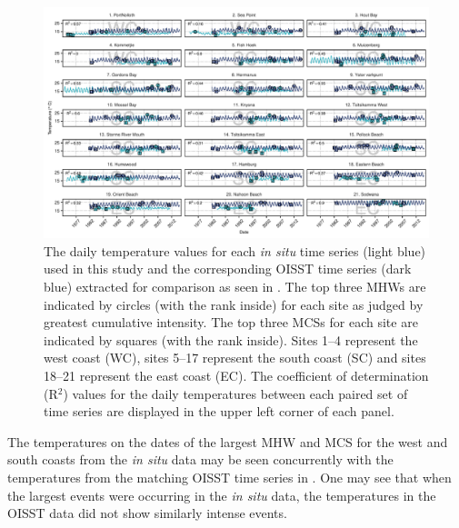 \documentclass[a4paper,10pt,review]{elsarticle}
\begin{document}
\begin{figure}
\centering
\includegraphics[width=1.0\textwidth]{figure2.pdf}
\caption{The daily temperature values for each \emph{in situ} time series (light blue) used in this study and the corresponding OISST time series (dark blue) extracted for comparison as seen in . The top three MHWs are indicated by circles (with the rank inside) for each site as judged by greatest cumulative intensity. The top three MCSs for each site are indicated by squares (with the rank inside). Sites 1--4 represent the west coast (WC), sites 5--17 represent the south coast (SC) and sites 18--21 represent the east coast (EC). The coefficient of determination (R$^2$) values for the daily temperatures between each paired set of time series are displayed in the upper left corner of each panel.}
\label{fig:Figure2}
\end{figure}

The temperatures on the dates of the largest MHW and MCS for the west and south coasts from the \emph{in situ} data may be seen concurrently with the temperatures from the matching OISST time series in . One may see that when the largest events were occurring in the \emph{in situ} data, the temperatures in the OISST data did not show similarly intense events.
\end{document}
